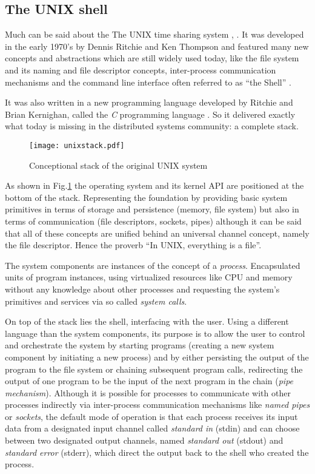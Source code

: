 \subsection{The UNIX shell}
\label{bash}
Much can be said about the The UNIX time sharing system
\cite{unix78}, \cite{unixdesign}. It was developed in the early
1970's by Dennis Ritchie and Ken Thompson and featured many
new concepts and abstractions which are still widely used today,
like the file system and its naming and file descriptor concepts,
inter-process communication mechanisms and the command line interface
often referred to as ``the Shell'' \cite{unix78}.

It was also written in a new programming language developed by
Ritchie and Brian Kernighan, called the \textit{C} programming
language \cite{c}. So it delivered exactly what today is missing
in the distributed systems community: a complete stack.

\begin{figure}[h]
  \texttt{[image: unixstack.pdf]}
  \caption{Conceptional stack of the original UNIX system}
  \label{unixstack}
\end{figure}

As shown in Fig.\ref{unixstack} the operating system and its
kernel API are positioned at the bottom of the stack. Representing the
foundation by providing basic system primitives in terms of
storage and persistence (memory, file system) but also in terms of
communication (file descriptors, sockets, pipes) although it can be
said that all of these concepts are unified behind an universal channel
concept, namely the file descriptor. Hence the proverb ``In UNIX,
everything is a file''.

The system components are instances of the concept of a \textit{process}.
Encapsulated units of program instances, using virtualized resources like
CPU and memory without any knowledge about other processes and requesting
the system's primitives and services via so called \textit{system calls}.

On top of the stack lies the shell, interfacing with the user.
Using a different language than the system components, its purpose is
to allow the user to control and orchestrate the system by starting
programs (creating a new system component by initiating a new process)
and by either persisting the output of the program to the file system or
chaining subsequent program calls, redirecting the output of one
program to be the input of the next program in the chain
(\textit{pipe mechanism}). Although it is possible for processes
to communicate with other processes indirectly via inter-process communication
mechanisms like \textit{named pipes} or \textit{sockets}, the default
mode of operation is that each process receives its input data from
a designated input channel called \textit{standard in} (stdin) and
can choose between two designated output channels, named
\textit{standard out} (stdout) and \textit{standard error} (stderr),
which direct the output back to the shell who created the process.

